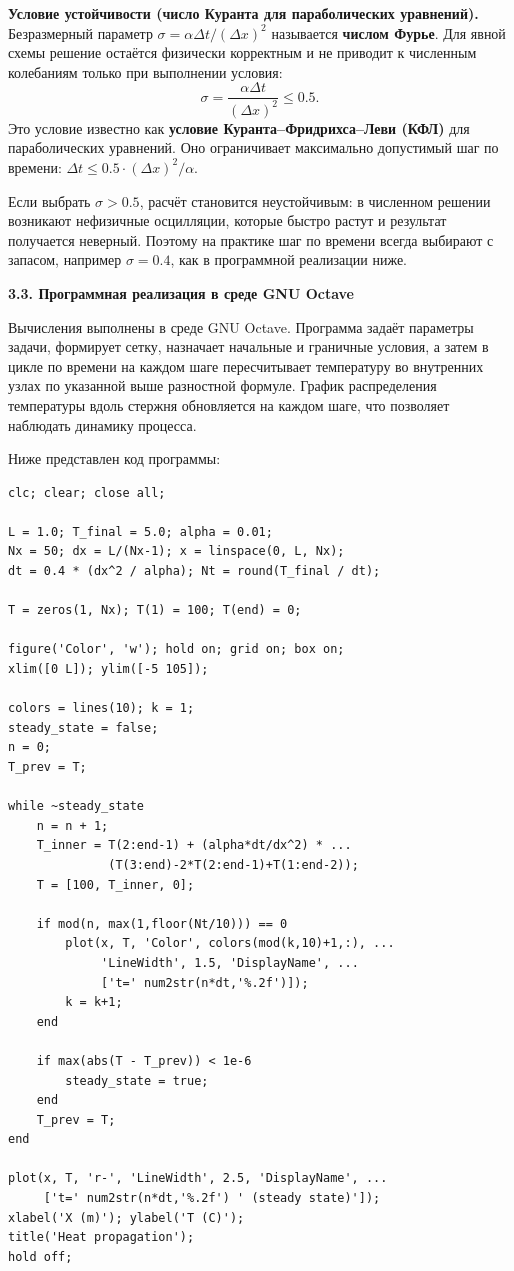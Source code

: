 \documentclass[a4paper,14pt]{extarticle}
\begin{document}
\noindent \textbf{Условие устойчивости (число Куранта для параболических уравнений).} 
Безразмерный параметр $\sigma = \alpha \Delta t / (\Delta x)^2$ называется \textbf{числом Фурье}. Для явной схемы решение остаётся физически корректным и не приводит к численным колебаниям только при выполнении условия:
\begin{equation}
    \sigma = \frac{\alpha \Delta t}{(\Delta x)^2} \le 0.5.
\end{equation}
Это условие известно как \textbf{условие Куранта--Фридрихса--Леви (КФЛ)} для параболических уравнений. Оно ограничивает максимально допустимый шаг по времени: $\Delta t \le 0.5 \cdot (\Delta x)^2 / \alpha$.

Если выбрать $\sigma > 0.5$, расчёт становится неустойчивым: в численном решении возникают нефизичные осцилляции, которые быстро растут и результат получается неверный. Поэтому на практике шаг по времени всегда выбирают с запасом, например $\sigma = 0.4$, как в программной реализации ниже.

\noindent \textbf{3.3. Программная реализация в среде GNU Octave}

\noindent Вычисления выполнены в среде GNU Octave. Программа задаёт параметры задачи, формирует сетку, назначает начальные и граничные условия, а затем в цикле по времени на каждом шаге пересчитывает температуру во внутренних узлах по указанной выше разностной формуле. График распределения температуры вдоль стержня обновляется на каждом шаге, что позволяет наблюдать динамику процесса.

\vspace{\baselineskip}

\noindent Ниже представлен код программы:

\begin{lstlisting}
clc; clear; close all;

L = 1.0; T_final = 5.0; alpha = 0.01;
Nx = 50; dx = L/(Nx-1); x = linspace(0, L, Nx);
dt = 0.4 * (dx^2 / alpha); Nt = round(T_final / dt);

T = zeros(1, Nx); T(1) = 100; T(end) = 0;

figure('Color', 'w'); hold on; grid on; box on;
xlim([0 L]); ylim([-5 105]);

colors = lines(10); k = 1;
steady_state = false;
n = 0;
T_prev = T;

while ~steady_state
    n = n + 1;
    T_inner = T(2:end-1) + (alpha*dt/dx^2) * ...
              (T(3:end)-2*T(2:end-1)+T(1:end-2));
    T = [100, T_inner, 0];

    if mod(n, max(1,floor(Nt/10))) == 0
        plot(x, T, 'Color', colors(mod(k,10)+1,:), ...
             'LineWidth', 1.5, 'DisplayName', ...
             ['t=' num2str(n*dt,'%.2f')]);
        k = k+1;
    end

    if max(abs(T - T_prev)) < 1e-6
        steady_state = true;
    end
    T_prev = T;
end

plot(x, T, 'r-', 'LineWidth', 2.5, 'DisplayName', ...
     ['t=' num2str(n*dt,'%.2f') ' (steady state)']);
xlabel('X (m)'); ylabel('T (C)');
title('Heat propagation');
hold off;
\end{lstlisting}
\end{document}
